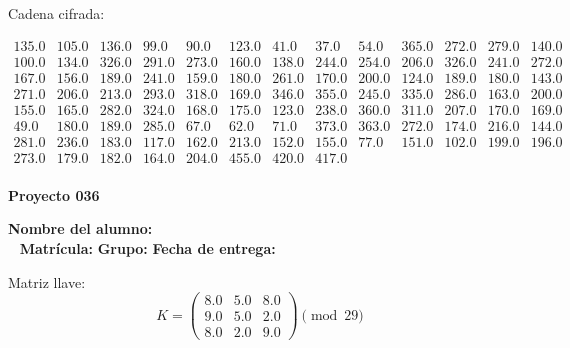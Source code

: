\documentclass[12pt]{article}
\begin{document}
Cadena cifrada:
\begin{center}
$\begin{array}{lllllllllllll}
135.0 & 105.0 & 136.0 & 99.0 & 90.0 & 123.0 & 41.0 & 37.0 & 54.0 & 365.0 & 272.0 & 279.0 & 140.0\\
100.0 & 134.0 & 326.0 & 291.0 & 273.0 & 160.0 & 138.0 & 244.0 & 254.0 & 206.0 & 326.0 & 241.0 & 272.0\\
167.0 & 156.0 & 189.0 & 241.0 & 159.0 & 180.0 & 261.0 & 170.0 & 200.0 & 124.0 & 189.0 & 180.0 & 143.0\\
271.0 & 206.0 & 213.0 & 293.0 & 318.0 & 169.0 & 346.0 & 355.0 & 245.0 & 335.0 & 286.0 & 163.0 & 200.0\\
155.0 & 165.0 & 282.0 & 324.0 & 168.0 & 175.0 & 123.0 & 238.0 & 360.0 & 311.0 & 207.0 & 170.0 & 169.0\\
49.0 & 180.0 & 189.0 & 285.0 & 67.0 & 62.0 & 71.0 & 373.0 & 363.0 & 272.0 & 174.0 & 216.0 & 144.0\\
281.0 & 236.0 & 183.0 & 117.0 & 162.0 & 213.0 & 152.0 & 155.0 & 77.0 & 151.0 & 102.0 & 199.0 & 196.0\\
273.0 & 179.0 & 182.0 & 164.0 & 204.0 & 455.0 & 420.0 & 417.0\\
\end{array}$
\end{center}

\newpage


\textbf{Proyecto 036}

\textbf{Nombre del alumno:} \underline{\hspace{13cm}}\\\
\vspace{1cm}
\textbf{Matrícula:} \underline{\hspace{4cm}} \hspace{1cm}
\textbf{Grupo:} \underline{\hspace{2cm}}
\textbf{Fecha de entrega:} \underline{\hspace{2cm}}

\medskip

Matriz llave:
\[
K = \begin{pmatrix}
8.0 & 5.0 & 8.0\\
9.0 & 5.0 & 2.0\\
8.0 & 2.0 & 9.0
\end{pmatrix} \pmod{29}
\]
\end{document}
